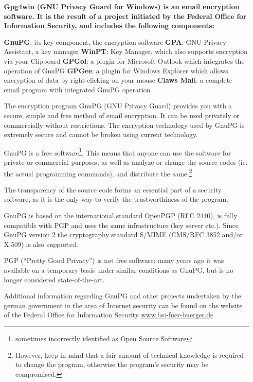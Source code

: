 

\textbf{
Gpg4win (GNU Privacy Guard for Windows) is an email encryption software.
It is the result of a project initiated by the Federal Office for
Information Security, and includes the following components: 
}

\textbf{GnuPG}: its key component, the encryption software \newline
\textbf{GPA}: GNU Privacy Assistant,
a key manager \newline
\textbf{WinPT}: Key Manager, which also supports encryption via your
Clipboard \newline
\textbf{GPGol}: a plugin for Microsoft Outlook which integrates the
operation of GnuPG \newline
\textbf{GPGee}: a plugin for Windows Explorer which allows encryption of
data by right-clicking on your mouse \newline
\textbf{Claws Mail}: a complete email program with integrated GnuPG
operation \newline

The encryption program GnuPG (GNU Privacy Guard) provides you with a
secure, simple and free method of email encryption. It can be used
privately or commercially without restrictions.  The encryption
technology used by GnuPG is extremely secure and cannot be broken using
current technology.

GnuPG is a free software\footnote{sometimes incorrectly identified as
Open Source Software}. This means that anyone can use the software for
private or commercial purposes, as well as analyze or change the source
codes (ie. the actual programming commands), and distribute the
same.\footnote{However, keep in mind that a fair amount of technical
knowledge is required to change the program, otherwise the program's
security may be compromised.}

The transparency of the source code forms an essential part of a
security software, as it is the only way to verify the trustworthiness
of the program.


GnuPG is based on the international standard OpenPGP (RFC 2440), is
fully compatible with PGP and uses the same infrastructure (key server
etc.). Since GnuPG version 2 the cryptography standard
S/MIME (CMS/RFC 3852 and/or X.509) is also supported.

PGP ("`Pretty Good Privacy"') is not free software; many years ago it
was available on a temporary basis under similar conditions as GnuPG,
but is no longer considered state-of-the-art.

Additional information regarding GnuPG and other projects undertaken by
the german government in the area of Internet security can be found on
the website of the Federal Office for Information Security \W
{}
\T\href{http://www.bsi-fuer-buerger.de}{www.bsi-fuer-buerger.de}



